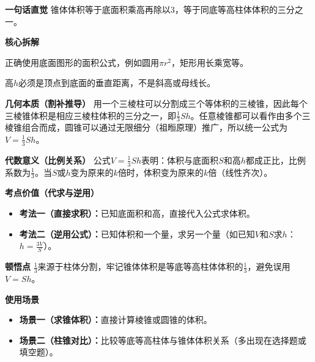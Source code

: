 \begin{explanationbox}
	\textbf{\textcolor{CExplanation}{一句话直觉}}
	锥体体积等于底面积乘高再除以3，等于同底等高柱体体积的三分之一。

	\medskip
	\textbf{\textcolor{CExplanation}{核心拆解}}
	\begin{description}[style=nextline, leftmargin=2.8em, labelsep=0.5em, itemsep=0.45em]
		\item[\textbf{要点一（底面积计算）：}]
			正确使用底面图形的面积公式，例如圆用$\pi r^2$，矩形用长乘宽等。
		\item[\textbf{要点二（垂直高）：}]
			高$h$必须是顶点到底面的垂直距离，不是斜高或母线长。
	\end{description}

	\medskip
	\textbf{\textcolor{CExplanation}{几何本质（割补推导）}}
	用一个三棱柱可以分割成三个等体积的三棱锥，因此每个三棱锥体积是相应三棱柱体积的三分之一，即$\frac{1}{3}Sh$。任意棱锥都可以看作由多个三棱锥组合而成，圆锥可以通过无限细分（祖暅原理）推广，所以统一公式为$V=\frac{1}{3}Sh$。

	\medskip
	\textbf{\textcolor{CExplanation}{代数意义（比例关系）}}
	公式$V=\frac{1}{3}Sh$表明：体积与底面积$S$和高$h$都成正比，比例系数为$\frac{1}{3}$。当$S$或$h$变为原来的$k$倍时，体积变为原来的$k$倍（线性齐次）。

	\medskip
	\textbf{\textcolor{CExplanation}{考点价值（代求与逆用）}}
	\begin{itemize}[leftmargin=*, itemsep=0.5em, topsep=0.4em]
		\item \textbf{考法一（直接求积）：}已知底面积和高，直接代入公式求体积。
		\item \textbf{考法二（逆用公式）：}已知体积和一个量，求另一个量（如已知$V$和$S$求$h$：$h = \frac{3V}{S}$）。
	\end{itemize}

	\medskip
	\textbf{\textcolor{CExplanation}{顿悟点}}
	$\frac{1}{3}$来源于柱体分割，牢记锥体体积是等底等高柱体体积的$\frac{1}{3}$，避免误用$V=Sh$。

	\medskip
	\textbf{\textcolor{CExplanation}{使用场景}}
	\begin{itemize}[leftmargin=*, itemsep=0.5em, topsep=0.4em]
		\item \textbf{场景一（求锥体积）：}直接计算棱锥或圆锥的体积。
		\item \textbf{场景二（柱锥对比）：}比较等底等高柱体与锥体体积关系（多出现在选择题或填空题）。
	\end{itemize}

\end{explanationbox}
